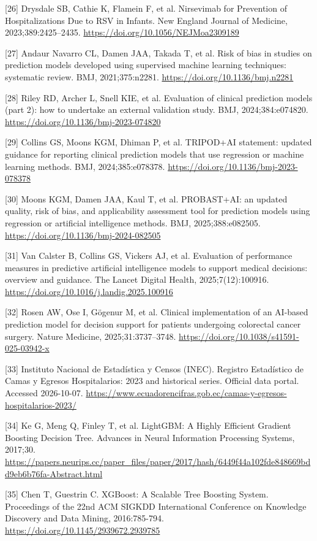 \documentclass[11pt,a4paper]{article}
\begin{document}
{\small [26] Drysdale SB, Cathie K, Flamein F, et al. Nirsevimab for Prevention of Hospitalizations Due to RSV in Infants. New England Journal of Medicine, 2023;389:2425–2435. \url{https://doi.org/10.1056/NEJMoa2309189}\par}
{\small [27] Andaur Navarro CL, Damen JAA, Takada T, et al. Risk of bias in studies on prediction models developed using supervised machine learning techniques: systematic review. BMJ, 2021;375:n2281. \url{https://doi.org/10.1136/bmj.n2281}\par}
{\small [28] Riley RD, Archer L, Snell KIE, et al. Evaluation of clinical prediction models (part 2): how to undertake an external validation study. BMJ, 2024;384:e074820. \url{https://doi.org/10.1136/bmj-2023-074820}\par}
{\small [29] Collins GS, Moons KGM, Dhiman P, et al. TRIPOD+AI statement: updated guidance for reporting clinical prediction models that use regression or machine learning methods. BMJ, 2024;385:e078378. \url{https://doi.org/10.1136/bmj-2023-078378}\par}
{\small [30] Moons KGM, Damen JAA, Kaul T, et al. PROBAST+AI: an updated quality, risk of bias, and applicability assessment tool for prediction models using regression or artificial intelligence methods. BMJ, 2025;388:e082505. \url{https://doi.org/10.1136/bmj-2024-082505}\par}
{\small [31] Van Calster B, Collins GS, Vickers AJ, et al. Evaluation of performance measures in predictive artificial intelligence models to support medical decisions: overview and guidance. The Lancet Digital Health, 2025;7(12):100916. \url{https://doi.org/10.1016/j.landig.2025.100916}\par}
{\small [32] Rosen AW, Ose I, Gögenur M, et al. Clinical implementation of an AI-based prediction model for decision support for patients undergoing colorectal cancer surgery. Nature Medicine, 2025;31:3737–3748. \url{https://doi.org/10.1038/s41591-025-03942-x}\par}
{\small [33] Instituto Nacional de Estadística y Censos (INEC). Registro Estadístico de Camas y Egresos Hospitalarios: 2023 and historical series. Official data portal. Accessed 2026-10-07. \url{https://www.ecuadorencifras.gob.ec/camas-y-egresos-hospitalarios-2023/}\par}
{\small [34] Ke G, Meng Q, Finley T, et al. LightGBM: A Highly Efficient Gradient Boosting Decision Tree. Advances in Neural Information Processing Systems, 2017;30. \url{https://papers.neurips.cc/paper_files/paper/2017/hash/6449f44a102fde848669bdd9eb6b76fa-Abstract.html}\par}
{\small [35] Chen T, Guestrin C. XGBoost: A Scalable Tree Boosting System. Proceedings of the 22nd ACM SIGKDD International Conference on Knowledge Discovery and Data Mining, 2016:785-794. \url{https://doi.org/10.1145/2939672.2939785}\par}
\end{document}
